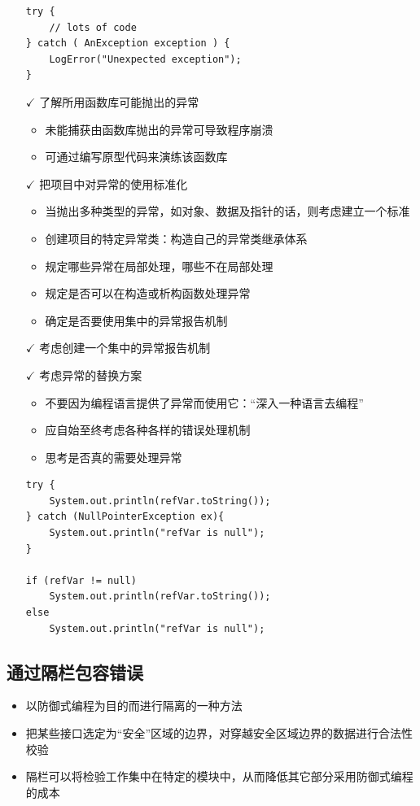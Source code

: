 \begin{itemize}[leftmargin=1em]
    \begin{lstlisting}
try {
    // lots of code
} catch ( AnException exception ) {
    LogError("Unexpected exception");
} 
    \end{lstlisting}
    \item[$\checkmark$] 了解所用函数库可能抛出的异常
    \begin{itemize}
        \item 未能捕获由函数库抛出的异常可导致程序崩溃
        \item 可通过编写原型代码来演练该函数库
    \end{itemize}
    \item[$\checkmark$] 把项目中对异常的使用标准化
    \begin{itemize}
        \item 当抛出多种类型的异常，如对象、数据及指针的话，则考虑建立一个标准
        \item 创建项目的特定异常类：构造自己的异常类继承体系
        \item 规定哪些异常在局部处理，哪些不在局部处理
        \item 规定是否可以在构造或析构函数处理异常
        \item 确定是否要使用集中的异常报告机制
    \end{itemize}
    \item[$\checkmark$] 考虑创建一个集中的异常报告机制
    \item[$\checkmark$] 考虑异常的替换方案
    \begin{itemize}
        \item 不要因为编程语言提供了异常而使用它：“深入一种语言去编程”
        \item 应自始至终考虑各种各样的错误处理机制
        \item 思考是否真的需要处理异常
    \end{itemize}
    \begin{lstlisting}
try {
    System.out.println(refVar.toString());
} catch (NullPointerException ex){
    System.out.println("refVar is null");
}

if (refVar != null)
    System.out.println(refVar.toString());
else
    System.out.println("refVar is null");
    \end{lstlisting}
\end{itemize}

\subsection{通过隔栏包容错误}
\begin{itemize}
    \item 以防御式编程为目的而进行隔离的一种方法
    \item 把某些接口选定为“安全”区域的边界，对穿越安全区域边界的数据进行合法性校验
    \item 隔栏可以将检验工作集中在特定的模块中，从而降低其它部分采用防御式编程的成本
\end{itemize}

